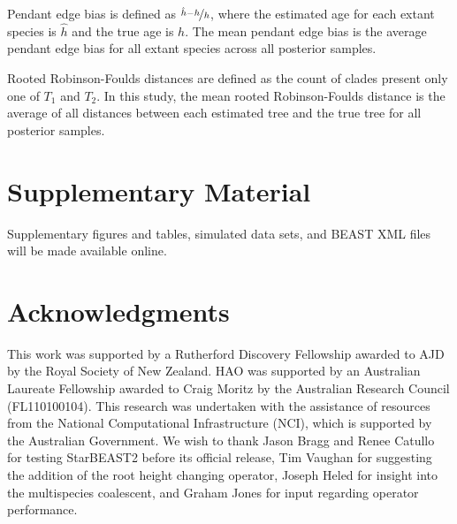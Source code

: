 \documentclass[12pt]{article}
\begin{document}
Pendant edge bias is defined as $\nicefrac{\hat{h} - h}{h}$, where the estimated
age for each extant species is $\hat{h}$ and the true age is $h$. The mean
pendant edge bias is the average pendant edge bias for all extant species across
all posterior samples.

Rooted Robinson-Foulds distances \citep{ROBINSON1981131} are defined as the
count of clades present only one of $T_1$ and $T_2$. In this study, the mean
rooted Robinson-Foulds distance is the average of all distances between each
estimated tree and the true tree for all posterior samples.

\section*{Supplementary Material}

Supplementary figures and tables, simulated data sets, and BEAST XML files will
be made available online.

\section*{Acknowledgments}

This work was supported by a Rutherford Discovery Fellowship awarded to AJD by
the Royal Society of New Zealand. HAO was supported by an Australian Laureate
Fellowship awarded to Craig Moritz by the Australian Research Council
(FL110100104). This research was undertaken with the assistance of resources
from the National Computational Infrastructure (NCI), which is supported by the
Australian Government. We wish to thank Jason Bragg and Renee Catullo for
testing StarBEAST2 before its official release, Tim Vaughan for suggesting the
addition of the root height changing operator, Joseph Heled for insight into the
multispecies coalescent, and Graham Jones for input regarding operator
performance.

\clearpage



\end{document}
